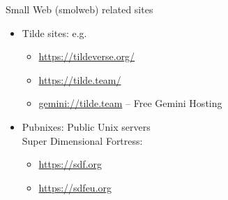 \documentclass[presentation, 11pt,  aspectratio=169]{beamer}
\begin{document}
\begin{frame}[label={sec:org4037343}]{Small Web (smolweb) related sites}
\begin{itemize}
\item \alert{Tilde sites:} e.g.\\
\begin{itemize}
\item \url{https://tildeverse.org/} \\
\item \url{https://tilde.team/} \\
\item \href{gemini://tilde.team}{gemini://tilde.team}  -- Free Gemini Hosting\\
\end{itemize}
\item \alert{Pubnixes:} Public Unix servers\\
Super Dimensional Fortress:\\
\begin{itemize}
\item \url{https://sdf.org}\\
\item \url{https://sdfeu.org}\\
\end{itemize}
\end{itemize}
\end{frame}
\end{document}
